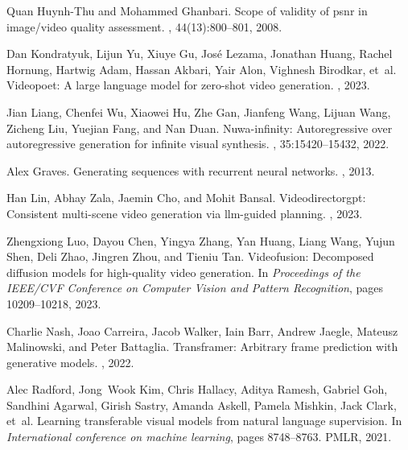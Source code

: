 \documentclass{article}
\begin{document}
\begin{thebibliography}{}
Quan Huynh-Thu and Mohammed Ghanbari.
\newblock Scope of validity of psnr in image/video quality assessment.
, 44(13):800--801, 2008.

Dan Kondratyuk, Lijun Yu, Xiuye Gu, Jos{\'e} Lezama, Jonathan Huang, Rachel Hornung, Hartwig Adam, Hassan Akbari, Yair Alon, Vighnesh Birodkar, et~al.
\newblock Videopoet: A large language model for zero-shot video generation.
, 2023.

Jian Liang, Chenfei Wu, Xiaowei Hu, Zhe Gan, Jianfeng Wang, Lijuan Wang, Zicheng Liu, Yuejian Fang, and Nan Duan.
\newblock Nuwa-infinity: Autoregressive over autoregressive generation for infinite visual synthesis.
, 35:15420--15432, 2022.

Alex Graves.
\newblock Generating sequences with recurrent neural networks.
, 2013.

Han Lin, Abhay Zala, Jaemin Cho, and Mohit Bansal.
\newblock Videodirectorgpt: Consistent multi-scene video generation via llm-guided planning.
, 2023.

Zhengxiong Luo, Dayou Chen, Yingya Zhang, Yan Huang, Liang Wang, Yujun Shen, Deli Zhao, Jingren Zhou, and Tieniu Tan.
\newblock Videofusion: Decomposed diffusion models for high-quality video generation.
\newblock In {\em Proceedings of the IEEE/CVF Conference on Computer Vision and Pattern Recognition}, pages 10209--10218, 2023.

Charlie Nash, Joao Carreira, Jacob Walker, Iain Barr, Andrew Jaegle, Mateusz Malinowski, and Peter Battaglia.
\newblock Transframer: Arbitrary frame prediction with generative models.
, 2022.

Alec Radford, Jong~Wook Kim, Chris Hallacy, Aditya Ramesh, Gabriel Goh, Sandhini Agarwal, Girish Sastry, Amanda Askell, Pamela Mishkin, Jack Clark, et~al.
\newblock Learning transferable visual models from natural language supervision.
\newblock In {\em International conference on machine learning}, pages 8748--8763. PMLR, 2021.


\end{thebibliography}
\end{document}
